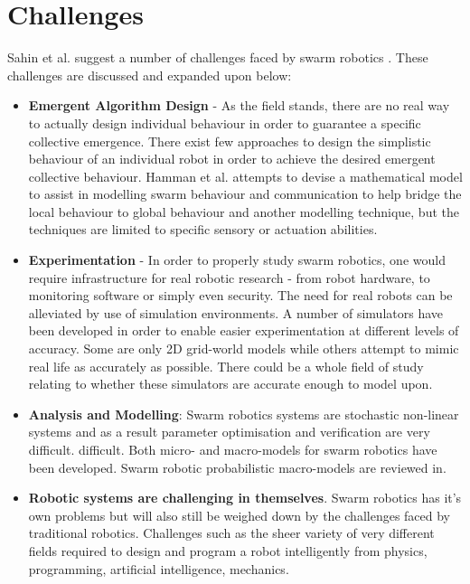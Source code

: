 \section{Challenges}
Sahin et al. suggest a number of challenges faced by swarm robotics \cite{csahin2008special}. These challenges are discussed and expanded upon below: 

\begin{itemize}

\item \textbf{Emergent Algorithm Design} - As the field stands, there are no real way to actually design individual behaviour in order to guarantee a specific collective emergence. There exist few approaches to design the simplistic behaviour of an individual robot in order to achieve the desired emergent collective behaviour. Hamman et al. attempts to devise a mathematical model to assist in modelling swarm behaviour and communication\cite{hamann2008framework} to help bridge the local behaviour to global behaviour and another modelling technique, but the techniques are limited to specific sensory or actuation abilities. 

\item \textbf{Experimentation} - In order to properly study swarm robotics, one would require infrastructure for real robotic research - from robot hardware, to monitoring software or simply even security. The need for real robots can be alleviated by use of simulation environments. A number of simulators have been developed in order to enable easier experimentation at different levels of accuracy. Some are only 2D grid-world models while others attempt to mimic real life as accurately as possible. There could be a whole field of study relating to whether these simulators are accurate enough to model upon.

\item \textbf{Analysis and Modelling}: Swarm robotics systems are stochastic non-linear systems and as a result parameter optimisation and verification are very difficult. difficult. Both micro- and macro-models for swarm robotics have been developed. Swarm robotic probabilistic macro-models are reviewed in\cite{lerman2005review}.

\item \textbf{Robotic systems are challenging in themselves}. Swarm robotics has it's own problems but will also still be weighed down by the challenges faced by traditional robotics. Challenges such as the sheer variety of very different fields required to design and program a robot intelligently from physics, programming, artificial intelligence, mechanics.
\end{itemize}


